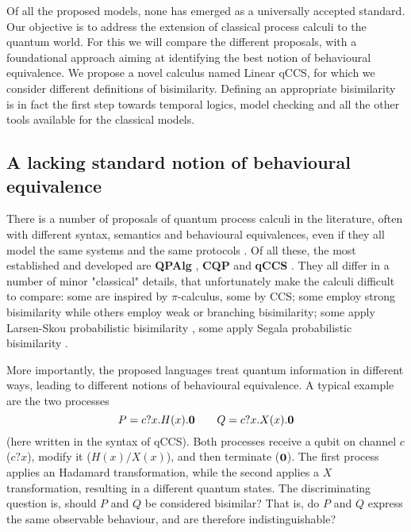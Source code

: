 Of all the proposed models, none has emerged as a universally accepted standard. Our objective is to address the extension of classical process calculi to the quantum world. For this we will compare the different proposals, with a foundational approach aiming at identifying the best notion of behavioural equivalence. We propose a novel calculus named Linear qCCS, for which we consider different definitions of bisimilarity.
Defining an appropriate bisimilarity is in fact the first step towards temporal logics, model checking and all the other tools available for the classical models.


\subsection*{A lacking standard notion of behavioural equivalence}

There is a number of proposals of quantum process calculi in the literature, often with different syntax, semantics and behavioural equivalences, even if they all model the same systems and the same protocols \cite{lalireProcessAlgebraicApproach2004, gayCommunicatingQuantumProcesses2005, fengProbabilisticBisimulationsQuantum2007, yingAlgebraQuantumProcesses2010, wangProbabilisticProcessAlgebra2019}. Of all these, the most established and developed are \textbf{QPAlg} \cite{lalireProcessAlgebraicApproach2004}, \textbf{CQP} \cite{gayCommunicatingQuantumProcesses2005} and \textbf{qCCS} \cite{fengProbabilisticBisimulationsQuantum2007}. They all differ in  a number of minor "classical" details, that unfortunately make the calculi difficult to compare: some are inspired by $\pi$-calculus, some by CCS; some employ strong bisimilarity while others employ weak or branching bisimilarity; some apply Larsen-Skou probabilistic bisimilarity \cite{larsenBisimulationProbabilisticTesting1991}, some apply Segala probabilistic bisimilarity \cite{segalaProbabilisticSimulationsProbabilistic1994}.

More importantly, the proposed languages treat quantum information in different ways, leading to different notions of behavioural equivalence. 
A typical example are the two processes 
\[P = c?x.H(x).\mathbf{0} \qquad Q = c?x.X(x).\mathbf{0}\]
(here written in the syntax of qCCS). Both processes receive a qubit on channel $c$ ($c?x$), modify it ($H(x) / X(x)$), and then terminate ($\mathbf{0}$). The first process applies an Hadamard transformation, while the second applies a $X$ transformation, resulting in a different quantum states. The discriminating question is, should $P$ and $Q$ be considered bisimilar? That is, do $P$ and $Q$ express the same observable behaviour, and are therefore indistinguishable? 

